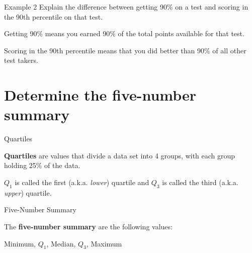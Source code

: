 \documentclass[t]{beamer}
\begin{document}
\begin{frame}{Example 2}
Explain the difference between getting 90\% on a test and scoring in the 90th percentile on that test.	\newline\\	\pause

Getting 90\% means you earned 90\% of the total points available for that test.	\newline\\	\pause

Scoring in the 90th percentile means that you did better than 90\% of all other test takers.
\end{frame}

\section{Determine the five-number summary}

\begin{frame}{Quartiles}
\begin{tcolorbox}[colframe=green!20!black, colback = green!30!white,title=\textbf{Quartiles}]
\textbf{Quartiles} are values that divide a data set into 4 groups, with each group holding 25\% of the data.
\end{tcolorbox}
\vspace{8pt}	\pause
\begin{center}
\end{center}
\vspace{8pt} \pause
$Q_1$ is called the first (a.k.a. \textit{lower}) quartile and $Q_3$ is called the third (a.k.a. \textit{upper}) quartile.
\end{frame}

\begin{frame}{Five-Number Summary}
\begin{tcolorbox}[colframe=green!20!black, colback = green!30!white,title=\textbf{Five-Number Summary}]
The \textbf{five-number summary} are the following values: 
\begin{center}
Minimum, $Q_1$, Median, $Q_3$, Maximum
\end{center}
\end{tcolorbox}
\end{frame}
\end{document}
